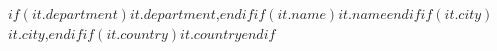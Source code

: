 $if(it.department)$$it.department$,$endif$$if(it.name)$$it.name$$endif$$if(it.city)$ $it.city$,$endif$$if(it.country)$$it.country$$endif$